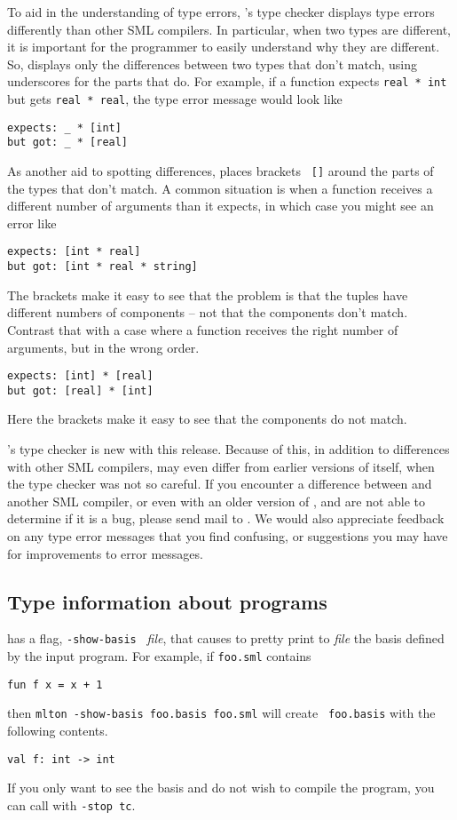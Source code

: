 To aid in the understanding of type errors, {\mlton}'s type checker
displays type errors differently than other SML compilers.  In
particular, when two types are different, it is important for the
programmer to easily understand why they are different.  So, {\mlton}
displays only the differences between two types that don't match,
using underscores for the parts that do.  For example, if a
function expects {\tt real * int} but gets {\tt real * real}, the type
error message would look like
\begin{verbatim}
expects: _ * [int]
but got: _ * [real]
\end{verbatim}
As another aid to spotting differences, {\mlton} places brackets {\tt
[]} around the parts of the types that don't match.  A common
situation is when a function receives a different number of arguments
than it expects, in which case you might see an error like
\begin{verbatim}
expects: [int * real]
but got: [int * real * string]
\end{verbatim}
The brackets make it easy to see that the problem is that the tuples
have different numbers of components -- not that the components don't
match.  Contrast that with a case where a function receives the right
number of arguments, but in the wrong order.
\begin{verbatim}
expects: [int] * [real]
but got: [real] * [int]
\end{verbatim}
Here the brackets make it easy to see that the components do not
match.

{\mlton}'s type checker is new with this release.  Because of this, in
addition to differences with other SML compilers, {\mlton} may even
differ from earlier versions of itself, when the type checker was not
so careful.  If you encounter a difference between {\mlton} and
another SML compiler, or even with an older version of {\mlton}, and
are not able to determine if it is a bug, please send mail to
{\mltonmail}.  We would also appreciate feedback on any type error
messages that you find confusing, or suggestions you may have for
improvements to error messages.

\subsection{Type information about programs}

{\mlton} has a flag, {\tt -show-basis } {\it file}, that causes
{\mlton} to pretty print to {\it file} the basis defined by the input
program.  For example, if {\tt foo.sml} contains
\begin{verbatim}
fun f x = x + 1
\end{verbatim}
then {\tt mlton -show-basis foo.basis foo.sml} will create {\tt
foo.basis} with the following contents.
\begin{verbatim}
val f: int -> int
\end{verbatim}
If you only want to see the basis and do not wish to compile the
program, you can call {\mlton} with {\tt -stop tc}.

